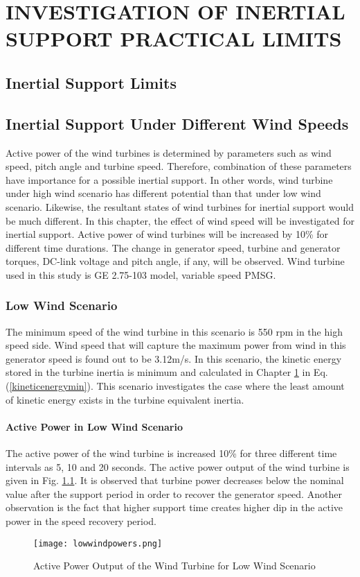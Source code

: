 \chapter{INVESTIGATION OF INERTIAL SUPPORT PRACTICAL LIMITS}
\label{chp:4}
\section{Inertial Support Limits}

\section{Inertial Support Under Different Wind Speeds}
Active power of the wind turbines is determined by parameters such as wind speed, pitch angle and turbine speed. Therefore, combination of these parameters have importance for a possible inertial support. In other words, wind turbine under high wind scenario has different potential than that under low wind scenario. Likewise, the resultant states of wind turbines for inertial support would be much different. In this chapter, the effect of wind speed will be investigated for inertial support. Active power of wind turbines will be increased by 10\% for different time durations. The change in generator speed, turbine and generator torques, DC-link voltage and pitch angle, if any, will be observed. Wind turbine used in this study is GE 2.75-103 model, variable speed PMSG.
\subsection{Low Wind Scenario}
\label{sec:lowwind}
The minimum speed of the wind turbine in this scenario is 550 rpm in the high speed side. Wind speed that will capture the maximum power from wind in this generator speed is found out to be 3.12m/s. In this scenario, the kinetic energy stored in the turbine inertia is minimum and calculated in Chapter \ref{chp:4} in Eq. (\ref{kineticenergymin}). This scenario investigates the case where the least amount of kinetic energy exists in the turbine equivalent inertia.\par
\subsubsection{Active Power in Low Wind Scenario}
The active power of the wind turbine is increased 10\% for three different time intervals as 5, 10 and 20 seconds. The active power output of the wind turbine is given in Fig. \ref{lowactivepowers}. It is observed that turbine power decreases below the nominal value after the support period in order to recover the generator speed. Another observation is the fact that higher support time creates higher dip in the active power in the speed recovery period.\par
\begin{figure}[h!]
	\centering
	\texttt{[image: lowwindpowers.png]}
	\caption{Active Power Output of the Wind Turbine for Low Wind Scenario}
	\label{lowactivepowers}
\end{figure}
